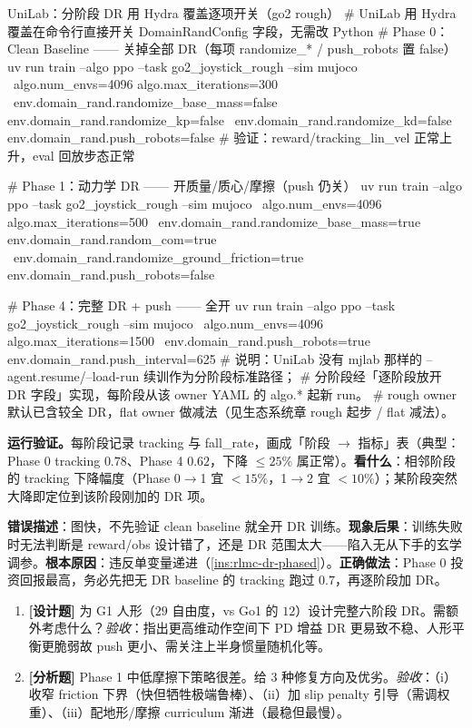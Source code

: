 \begin{codebox}[bash]{UniLab：分阶段 DR 用 Hydra 覆盖逐项开关（go2 rough）}
# UniLab 用 Hydra 覆盖在命令行直接开关 DomainRandConfig 字段，无需改 Python
# Phase 0：Clean Baseline —— 关掉全部 DR（每项 randomize_* / push_robots 置 false）
uv run train --algo ppo --task go2_joystick_rough --sim mujoco \
    algo.num_envs=4096 algo.max_iterations=300 \
    env.domain_rand.randomize_base_mass=false env.domain_rand.randomize_kp=false \
    env.domain_rand.randomize_kd=false env.domain_rand.push_robots=false
# 验证：reward/tracking_lin_vel 正常上升，eval 回放步态正常

# Phase 1：动力学 DR —— 开质量/质心/摩擦（push 仍关）
uv run train --algo ppo --task go2_joystick_rough --sim mujoco \
    algo.num_envs=4096 algo.max_iterations=500 \
    env.domain_rand.randomize_base_mass=true env.domain_rand.random_com=true \
    env.domain_rand.randomize_ground_friction=true env.domain_rand.push_robots=false

# Phase 4：完整 DR + push —— 全开
uv run train --algo ppo --task go2_joystick_rough --sim mujoco \
    algo.num_envs=4096 algo.max_iterations=1500 \
    env.domain_rand.push_robots=true env.domain_rand.push_interval=625
# 说明：UniLab 没有 mjlab 那样的 --agent.resume/--load-run 续训作为分阶段标准路径；
#   分阶段经「逐阶段放开 DR 字段」实现，每阶段从该 owner YAML 的 algo.* 起新 run。
#   rough owner 默认已含较全 DR，flat owner 做减法（见生态系统章 rough 起步 / flat 减法）。
\end{codebox}

\textbf{运行验证。}每阶段记录 tracking 与 fall\_rate，画成「阶段 $\to$ 指标」表（典型：Phase 0 tracking $0.78$、Phase 4 $0.62$，下降 $\le 25\%$ 属正常）。\textbf{看什么}：相邻阶段的 tracking 下降幅度（Phase 0$\to$1 宜 $<15\%$，1$\to$2 宜 $<10\%$）；某阶段突然大降即定位到该阶段刚加的 DR 项。

\begin{pitfall}[跳过 Phase 0 直接从 Phase 4 开始]
\textbf{错误描述}：图快，不先验证 clean baseline 就全开 DR 训练。\textbf{现象后果}：训练失败时无法判断是 reward/obs 设计错了，还是 DR 范围太大——陷入无从下手的玄学调参。\textbf{根本原因}：违反单变量递进（\cref{ins:rlmc-dr-phased}）。\textbf{正确做法}：Phase 0 投资回报最高，务必先把无 DR baseline 的 tracking 跑过 $0.7$，再逐阶段加 DR。
\end{pitfall}

\begin{practice}[本节练习]
\begin{enumerate}
  \item \textbf{[设计题]} 为 G1 人形（$29$ 自由度，vs Go1 的 $12$）设计完整六阶段 DR。需额外考虑什么？\emph{验收}：指出更高维动作空间下 PD 增益 DR 更易致不稳、人形平衡更脆弱故 push 更小、需关注上半身惯量随机化等。
  \item \textbf{[分析题]} Phase 1 中低摩擦下策略很差。给 3 种修复方向及优劣。\emph{验收}：（i）收窄 friction 下界（快但牺牲极端鲁棒）、（ii）加 slip penalty 引导（需调权重）、（iii）配地形/摩擦 curriculum 渐进（最稳但最慢）。
\end{enumerate}
\end{practice}

